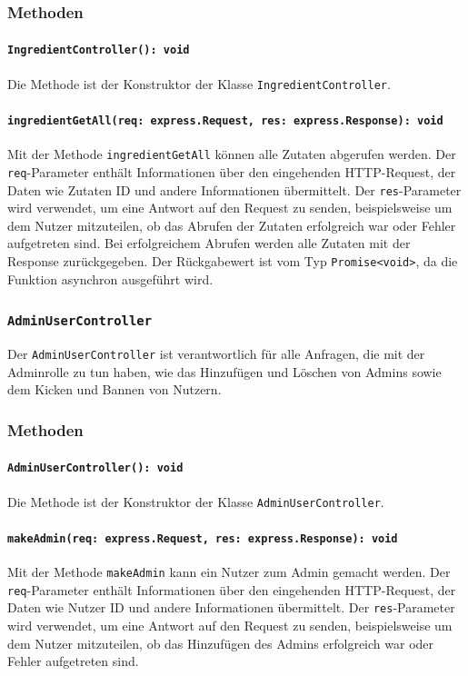 \documentclass{entwurfsheft}
\begin{document}
\subsubsection*{Methoden}
\paragraph{\texttt{IngredientController(): void}}
Die Methode ist der Konstruktor der Klasse \texttt{IngredientController}.
\paragraph{\texttt{ingredientGetAll(req: express.Request, res: express.Response): void}}
Mit der Methode \texttt{ingredientGetAll} können alle Zutaten abgerufen werden. Der \texttt{req}-Parameter enthält Informationen über den eingehenden HTTP-Request, der Daten wie Zutaten ID und andere Informationen übermittelt. Der \texttt{res}-Parameter wird verwendet, um eine Antwort auf den Request zu senden, beispielsweise um dem Nutzer mitzuteilen, ob das Abrufen der Zutaten erfolgreich war oder Fehler aufgetreten sind. Bei erfolgreichem Abrufen werden alle Zutaten mit der Response zurückgegeben.
Der Rückgabewert ist vom Typ \texttt{Promise<void>}, da die Funktion asynchron ausgeführt wird.

\subsubsection{\texttt{AdminUserController}}\label{sec:AdminUserController}
Der \texttt{AdminUserController} ist verantwortlich für alle Anfragen, die mit der Adminrolle zu tun haben, wie das Hinzufügen und Löschen von Admins sowie dem Kicken und Bannen von Nutzern.
\subsubsection*{Methoden}
\paragraph{\texttt{AdminUserController(): void}}
Die Methode ist der Konstruktor der Klasse \texttt{AdminUserController}.
\paragraph{\texttt{makeAdmin(req: express.Request, res: express.Response): void}}
Mit der Methode \texttt{makeAdmin} kann ein Nutzer zum Admin gemacht werden. Der \texttt{req}-Parameter enthält Informationen über den eingehenden HTTP-Request, der Daten wie Nutzer ID und andere Informationen übermittelt. Der \texttt{res}-Parameter wird verwendet, um eine Antwort auf den Request zu senden, beispielsweise um dem Nutzer mitzuteilen, ob das Hinzufügen des Admins erfolgreich war oder Fehler aufgetreten sind.
\end{document}
